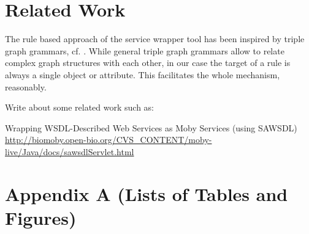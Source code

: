 \documentclass{article}
\begin{document}
\clearpage
\section{Related Work} %
\label{sec:related_work}

The rule based approach of the service wrapper tool has been inspired by triple graph grammars, cf. \cite{conf/wg/Schurr94,JSZ97c}. While general triple graph grammars allow to relate complex graph structures with each other, in our case the target of a rule is always a single object or attribute. This facilitates the whole mechanism, reasonably. 

Write about some related work such as:

Wrapping WSDL-Described Web Services as Moby Services (using SAWSDL)
\url{http://biomoby.open-bio.org/CVS_CONTENT/moby-live/Java/docs/sawsdlServlet.html}




\clearpage



\clearpage
\doublespacing
\section*{Appendix A (Lists of Tables and Figures)}

\listoftables

\listoffigures
\end{document}

